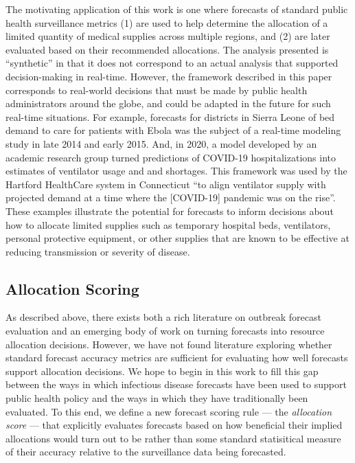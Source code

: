 \documentclass{article}
\begin{document}
The motivating application of this work is one where forecasts of standard public health surveillance metrics (1) are used to help determine the allocation of a limited quantity of medical supplies across multiple regions, and (2) are later evaluated based on their recommended allocations.  
The analysis presented is ``synthetic'' in that it does not correspond to an actual analysis that supported decision-making in real-time.
However, the framework described in this paper corresponds to real-world decisions that must be made by public health administrators around the globe, and could be adapted in the future for such real-time situations.  
For example, forecasts for districts in Sierra Leone of bed demand to care for patients with Ebola was the subject of a real-time modeling study in late 2014 and early 2015\cite{camacho2015-ebola-bed}.
And, in 2020, a model developed by an academic research group turned predictions of COVID-19 hospitalizations into estimates of ventilator usage and and shortages. This framework was used by the Hartford HealthCare system in Connecticut ``to align ventilator supply with projected demand at a time where the [COVID-19] pandemic was on the rise''\cite{bertsimas2021predictionsCOVID}. 
These examples illustrate the potential for forecasts to inform decisions about how to allocate limited supplies such as temporary hospital beds, ventilators, personal protective equipment, or other supplies that are known to be effective at reducing transmission or severity of disease.

\subsection{Allocation Scoring}

As described above, there exists both a rich literature on outbreak forecast evaluation and an emerging body of work on turning forecasts into resource allocation decisions. 
However, we have not found literature exploring whether standard forecast accuracy metrics are sufficient for evaluating how well forecasts support allocation decisions.
We hope to begin in this work to fill this gap between the ways in which infectious disease forecasts have been used to support public health policy and the ways in which they have traditionally been evaluated. 
To this end, we define a new forecast scoring rule --- the {\em allocation score} --- that explicitly evaluates forecasts based on how beneficial their implied allocations would turn out to be rather than some standard statisitical measure of their accuracy relative to the surveillance data being forecasted.
\end{document}
